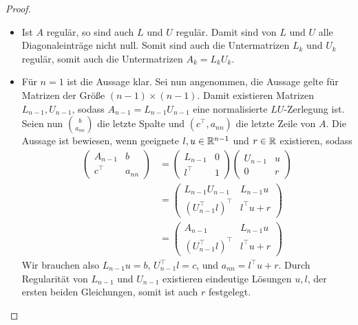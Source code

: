 \documentclass{report}
\begin{document}
\begin{proof}
	\phantom{}
	\begin{itemize}
		\item[$\rightarrow$] Ist $A$ regulär, so sind auch $L$ und $U$ regulär. Damit sind von $L$ und $U$ alle Diagonaleinträge nicht null. Somit sind auch die Untermatrizen $L_k$ und $U_k$ regulär, somit auch die Untermatrizen $A_k = L_k U_k$.
		\item[$\leftarrow$] Für $n = 1$ ist die Aussage klar. Sei nun angenommen, die Aussage gelte für Matrizen der Größe $(n - 1) \times (n - 1)$. Damit existieren Matrizen $L_{n-1}, U_{n-1}$, sodass $A_{n-1} = L_{n-1}U_{n-1}$ eine normalisierte $LU$-Zerlegung ist. Seien nun $\binom{b}{a_{nn}}$ die letzte Spalte und $(c^\top, a_{nn})$ die letzte Zeile von $A$. Die Aussage ist bewiesen, wenn geeignete $l,u \in \mathbb{R}^{n-1}$ und $r \in \mathbb{R}$ existieren, sodass
		\begin{align*}
			\begin{pmatrix}
				A_{n-1} & b\\
				c^\top & a_{nn}
			\end{pmatrix}
			&=
			\begin{pmatrix}
				L_{n-1} & 0\\
				l^\top & 1
			\end{pmatrix}
			\begin{pmatrix}
				U_{n-1} & u\\
				0 & r
			\end{pmatrix}\\
			&=
			\begin{pmatrix}
				L_{n-1}U_{n-1} & L_{n-1}u\\
				(U^\top_{n-1} l)^\top & l^\top u + r
			\end{pmatrix}\\
			&=
			\begin{pmatrix}
				A_{n-1} & L_{n-1}u\\
				(U^\top_{n-1} l)^\top & l^\top u + r
			\end{pmatrix}
		\end{align*}
		Wir brauchen also $L_{n-1}u = b$, $U_{n-1}^\top l = c$, und $a_{nn} = l^\top u + r$. Durch Regularität von $L_{n-1}$ und $U_{n-1}$ existieren eindeutige Lösungen $u, l$, der ersten beiden Gleichungen, somit ist auch $r$ festgelegt.
	\end{itemize}
\end{proof}
\end{document}
